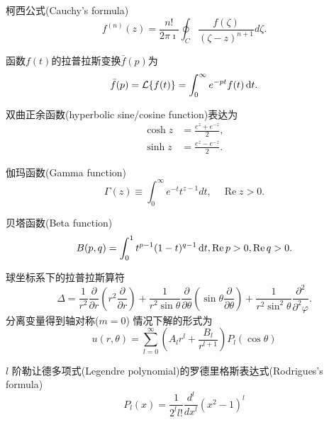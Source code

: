\documentclass{njustexam}
\begin{document}
\vfill
\newpage
{} %
柯西公式(Cauchy's formula)
\[
  f^{(n)}(z) = \frac{n!}{2\pi \imath} \oint_C \frac{f(\zeta)}{(\zeta - z)^{n+1}} d \zeta. 
  \label{eq:cauchy_formula_nth_derivative}
\]

\bigskip
函数$f(t)$的拉普拉斯变换$\bar{f}(p)$为
\[
    \bar{f}(p) = \mathcal{L} \{ f(t) \} = \int_0 ^{\infty} e^{-pt} f(t) \mathop{}\!\mathrm{d} t . 
\]

\bigskip

双曲正余函数(hyperbolic sine/cosine function)表达为
\begin{align*}
    \cosh z&= \frac{e^{z} + e^{ - z} }{2} , 
    \\
    \sinh z &= \frac{e^{z} - e^{ - z} }{2} . 
\end{align*}

伽玛函数(Gamma function)
\[
  \Gamma(z) \equiv \int_{0}^{\infty} e^{-t} t^{z-1} d t,  \quad \operatorname{Re} z>0 . 
\]
\bigskip

贝塔函数(Beta function)
\[
    B(p,  q) = \int_0^1 t^{p -1} (1-t)^{q-1} \mathop{}\!\mathrm{d} t,  \operatorname{Re} p> 0,  \operatorname{Re} q >0. 
    \label{eq:beta_def1}
\]
\bigskip

球坐标系下的拉普拉斯算符
\[
 \Delta = \frac{1}{r^2} \frac{\partial}{\partial r} \left( r^2 \frac{\partial }{\partial r} \right)
  + \frac{1}{r^2\sin \theta} \frac{\partial}{\partial \theta} \left( \sin\theta \frac{\partial}{\partial \theta} \right)
  + \frac{1}{r^2\sin^2 \theta} \frac{\partial^2}{\partial^2 \varphi} .
\]
分离变量得到轴对称($m=0$)
情况下解的形式为
\[
  u(r,  \theta) = \sum_{l=0}^{\infty} \left( A_l r^l + \frac{B_l}{r^{l+1}} \right) P_{l} (\cos \theta)
\]

\bigskip

$l$ 阶勒让德多项式(Legendre polynomial)的罗德里格斯表达式(Rodrigues's formula) 
$$P_l(x)=\frac{1}{2^l l !} \frac{d^l}{d x^l}\left(x^2-1\right)^l$$
\end{document}
